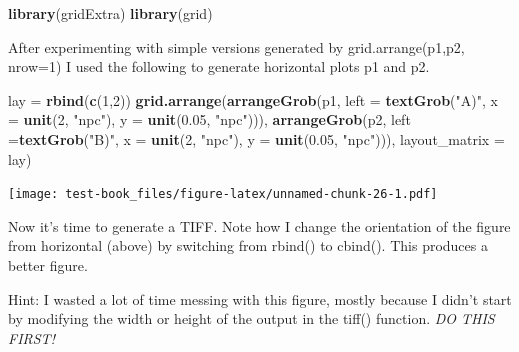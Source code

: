 \documentclass[]{book}
\newenvironment{Shaded}{\begin{snugshade}}{\end{snugshade}}
\newcommand{\DataTypeTok}[1]{\textcolor[rgb]{0.13,0.29,0.53}{#1}}
\newcommand{\DecValTok}[1]{\textcolor[rgb]{0.00,0.00,0.81}{#1}}
\newcommand{\FloatTok}[1]{\textcolor[rgb]{0.00,0.00,0.81}{#1}}
\newcommand{\KeywordTok}[1]{\textcolor[rgb]{0.13,0.29,0.53}{\textbf{#1}}}
\newcommand{\NormalTok}[1]{#1}
\newcommand{\StringTok}[1]{\textcolor[rgb]{0.31,0.60,0.02}{#1}}
\begin{document}
\begin{Shaded}
\begin{Highlighting}[]
\KeywordTok{library}\NormalTok{(gridExtra)}
\KeywordTok{library}\NormalTok{(grid)}
\end{Highlighting}
\end{Shaded}

After experimenting with simple versions generated by grid.arrange(p1,p2, nrow=1) I used the following to generate horizontal plots p1 and p2.

\begin{Shaded}
\begin{Highlighting}[]
\NormalTok{lay =}\StringTok{ }\KeywordTok{rbind}\NormalTok{(}\KeywordTok{c}\NormalTok{(}\DecValTok{1}\NormalTok{,}\DecValTok{2}\NormalTok{))}
\KeywordTok{grid.arrange}\NormalTok{(}\KeywordTok{arrangeGrob}\NormalTok{(p1, }\DataTypeTok{left =} \KeywordTok{textGrob}\NormalTok{(}\StringTok{"A)"}\NormalTok{, }\DataTypeTok{x =} \KeywordTok{unit}\NormalTok{(}\DecValTok{2}\NormalTok{, }\StringTok{"npc"}\NormalTok{), }
                               \DataTypeTok{y =} \KeywordTok{unit}\NormalTok{(}\FloatTok{0.05}\NormalTok{, }\StringTok{"npc"}\NormalTok{))), }
                   \KeywordTok{arrangeGrob}\NormalTok{(p2, }\DataTypeTok{left =}\KeywordTok{textGrob}\NormalTok{(}\StringTok{"B)"}\NormalTok{, }\DataTypeTok{x =} \KeywordTok{unit}\NormalTok{(}\DecValTok{2}\NormalTok{, }\StringTok{"npc"}\NormalTok{), }
                               \DataTypeTok{y =} \KeywordTok{unit}\NormalTok{(}\FloatTok{0.05}\NormalTok{, }\StringTok{"npc"}\NormalTok{))),}
                   \DataTypeTok{layout_matrix =}\NormalTok{ lay)}
\end{Highlighting}
\end{Shaded}

\texttt{[image: test-book\_files/figure-latex/unnamed-chunk-26-1.pdf]}

Now it's time to generate a TIFF. Note how I change the orientation of the figure from horizontal (above) by switching from rbind() to cbind(). This produces a better figure.

Hint: I wasted a lot of time messing with this figure, mostly because I didn't start by modifying the width or height of the output in the tiff() function. \emph{DO THIS FIRST!}
\end{document}

